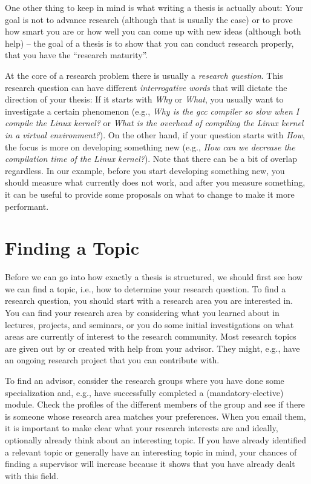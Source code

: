 \documentclass[a4paper]{article}
\begin{document}
One other thing to keep in mind is what writing a thesis is actually about:
Your goal is not to advance research (although that is usually the case) or to prove how smart you are or how well you can come up with new ideas (although both help) -- the goal of a thesis is to show that you can conduct research properly, that you have the ``research maturity''.

At the core of a research problem there is usually a \emph{research question}.
This research question can have different \emph{interrogative words} that will dictate the direction of your thesis:
If it starts with \emph{Why} or \emph{What}, you usually want to investigate a certain phenomenon (e.g., \emph{Why is the gcc compiler so slow when I compile the Linux kernel?} or \emph{What is the overhead of compiling the Linux kernel in a virtual environment?}).
On the other hand, if your question starts with \emph{How}, the focus is more on developing something new (e.g., \emph{How can we decrease the compilation time of the Linux kernel?}).
Note that there can be a bit of overlap regardless.
In our example, before you start developing something new, you should measure what currently does not work, and after you measure something, it can be useful to provide some proposals on what to change to make it more performant.

\section{Finding a Topic}
\label{sec:topic}

Before we can go into how exactly a thesis is structured, we should first see how we can find a topic, i.e., how to determine your research question.
To find a research question, you should start with a research area you are interested in.
You can find your research area by considering what you learned about in lectures, projects, and seminars, or you do some initial investigations on what areas are currently of interest to the research community.
Most research topics are given out by or created with help from your advisor.
They might, e.g., have an ongoing research project that you can contribute with.

To find an advisor, consider the research groups where you have done some specialization and, e.g., have successfully completed a (mandatory-elective) module.
Check the profiles of the different members of the group and see if there is someone whose research area matches your preferences.
When you email them, it is important to make clear what your research interests are and ideally, optionally already think about an interesting topic.
If you have already identified a relevant topic or generally have an interesting topic in mind, your chances of finding a supervisor will increase because it shows that you have already dealt with this field.
\end{document}
